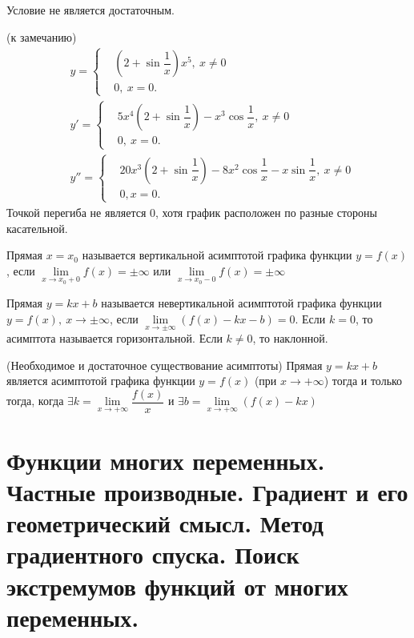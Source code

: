 \begin{multicols}{2}
    \begin{note}{}{}
         Условие не является достаточным.
    \end{note}
    \Ex (к замечанию)
    \begin{align*}
        &y = \begin{cases}
                &(2+\sin\dfrac{1}{x})x^5,\ x\neq 0\\
                &0,\ x= 0.
            \end{cases}\\
        &y' = \begin{cases}
                  &5x^4(2+\sin\dfrac{1}{x}) - x^3\cos\dfrac{1}{x},\ x\neq 0\\
                  &0,\ x = 0.
                \end{cases}\\
          &y'' = \begin{cases}
                      &20x^3(2+\sin\dfrac{1}{x}) - 8x^2\cos\dfrac{1}{x} - x\sin\dfrac{1}{x},\ x\neq 0\\
                      &0, x = 0.
                 \end{cases}
    \end{align*}
    Точкой перегиба не является 0, хотя график расположен по разные стороны касательной.
    
    \begin{definition}{}{}
         Прямая $x=x_0$ называется вертикальной асимптотой графика функции $y = f(x)$, если $\lim\limits_{x\to x_0+0}f(x) = \pm\infty$ или $\lim\limits_{x\to x_0-0} f(x) = \pm\infty$
    \end{definition}
    \begin{definition}{}{}
        Прямая $y = kx+b$ называется невертикальной асимптотой графика функции $y = f(x),\ x\to \pm \infty$, если $\lim\limits_{x\to \pm\infty} (f(x) - kx - b) = 0$. Если $k=0$, то асимптота называется горизонтальной. Если $k\neq 0$, то наклонной.
    \end{definition}
    \begin{theorema}{(Необходимое и достаточное существование асимптоты)}{}
        Прямая $y = kx+b$ является асимптотой графика функции $y = f(x)$ (при $x\to +\infty$) тогда и только тогда, когда $\exists k = \lim\limits_{x\to + \infty} \dfrac{f(x)}{x}$ и $\exists b = \lim\limits_{x\to + \infty} (f(x) - kx)$
    \end{theorema}
    \section{Функции многих переменных. Частные производные. Градиент и его геометрический
    смысл. Метод градиентного спуска. Поиск экстремумов функций от многих
    переменных.}

\end{multicols}
